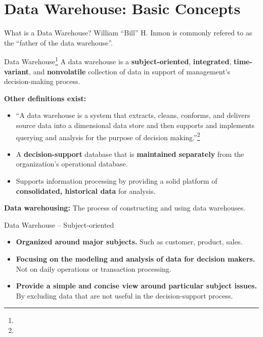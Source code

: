 \section{Data Warehouse: Basic Concepts}

\begin{frame}{What is a Data Warehouse?}
	William ``Bill'' H.  Inmon is commonly refered to as the ``father of the data warehouse''.
	\begin{block}{Data Warehouse\footnote{}}
		A data warehouse is a \textbf{subject-oriented}, \textbf{integrated}, \textbf{time-variant}, and \textbf{nonvolatile} collection of data in support of management's decision-making process.
	\end{block}

	\small
	\textbf{Other definitions exist:}
	\begin{itemize}
		\item ``A data warehouse is a system that extracts, cleans, conforms, and delivers source data into a dimensional data store and then supports and implements querying and analysis for the purpose of decision making.''\footnote{}
		\item A \textbf{\color{airforceblue}decision-support} database that is
		      \textbf{\color{airforceblue}maintained separately} from the organization's
		      operational database.
		\item Supports information processing by providing a solid platform of
		      \textbf{\color{airforceblue}consolidated, historical data} for analysis.
	\end{itemize}

	\textbf{\color{airforceblue}Data warehousing:} The process of constructing and using data warehouses.
\end{frame}

\begin{frame}{Data Warehouse -- Subject-oriented}
	\begin{itemize}
		\item \textbf{Organized around major subjects.} Such as customer, product,
		      sales.
		\item \textbf{Focusing on the modeling and analysis of data for
				      {\color{airforceblue}decision makers}.} Not on daily operations or
		      transaction processing.
		\item \textbf{Provide a simple and concise view around particular
			      subject issues.} By excluding data that are not useful in the
		      decision-support process.
	\end{itemize}
\end{frame}

